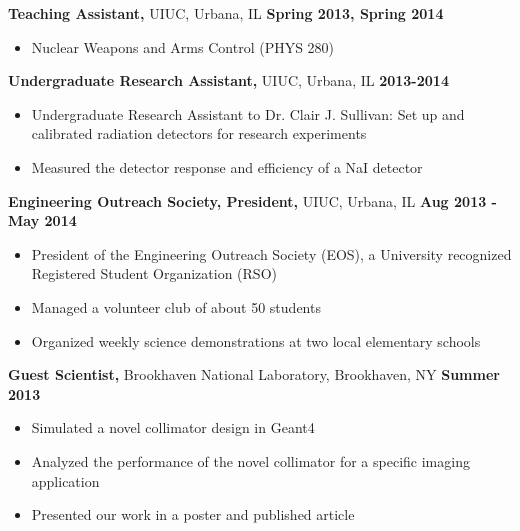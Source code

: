 \documentclass[margin]{res}
\begin{document}
\begin{resume}
\vspace{-.05in}
 
 {\bf Teaching Assistant,} UIUC, Urbana, IL \hfill \textbf{Spring 2013, Spring 2014} 

 \begin{itemize} \itemsep -3pt  %
 \item Nuclear Weapons and Arms Control (PHYS 280)
 \end{itemize}

\vspace{-.05in}
 
 {\bf Undergraduate Research Assistant,} UIUC, Urbana, IL \hfill  \textbf{2013-2014}
\begin{itemize} \itemsep -3pt %
\item Undergraduate Research Assistant to Dr. Clair J. Sullivan: Set up and calibrated radiation detectors for research experiments
\item Measured the detector response and efficiency of a NaI detector  
\end{itemize}

\vspace{-.05in}



 {\bf Engineering Outreach Society, President,} UIUC, Urbana, IL \hfill \textbf{Aug 2013 - May 2014}
 \begin{itemize} \itemsep -3pt  %
 \item President of the Engineering Outreach Society (EOS), a University recognized Registered Student Organization (RSO)
 \item Managed a volunteer club of about 50 students 
 \item Organized weekly science demonstrations at two local elementary schools

 \end{itemize} 









 {\bf Guest Scientist,} Brookhaven National Laboratory, Brookhaven, NY \hfill \textbf{Summer 2013}
 \begin{itemize} \itemsep -3pt  %
 \item Simulated a novel collimator design in Geant4
 \item Analyzed the performance of the novel collimator for a specific imaging application 
 \item Presented our work in a poster and published article 
 \end{itemize} 




\end{resume}
\end{document}
